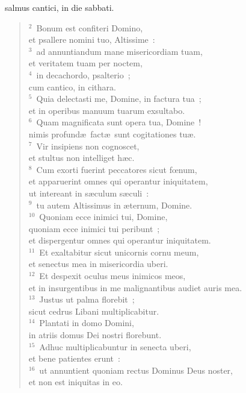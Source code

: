 \bchapter
{}salmus cantici, in die sabbati.
\begin{flushleft}\begin{verse}\vspace{6pt}${}^{2}$~Bonum est confiteri Domino,\\ et psallere nomini tuo, Altissime~:\\
${}^{3}$~ad annuntiandum mane misericordiam tuam,\\ et veritatem tuam per noctem,\\
${}^{4}$~in decachordo, psalterio~;\\ cum cantico, in cithara.\\
${}^{5}$~Quia delectasti me, Domine, in factura tua~;\\ et in operibus manuum tuarum exsultabo.\\
${}^{6}$~Quam magnificata sunt opera tua, Domine~!\\ nimis profund\ae\ fact\ae\ sunt cogitationes tu\ae .\\
${}^{7}$~Vir insipiens non cognoscet,\\ et stultus non intelliget h\ae c.\\
${}^{8}$~Cum exorti fuerint peccatores sicut fœnum,\\ et apparuerint omnes qui operantur iniquitatem,\\ ut intereant in s\ae culum s\ae culi~:\\
${}^{9}$~tu autem Altissimus in \ae ternum, Domine.\\
${}^{10}$~Quoniam ecce inimici tui, Domine,\\ quoniam ecce inimici tui peribunt~;\\ et dispergentur omnes qui operantur iniquitatem.\\
${}^{11}$~Et exaltabitur sicut unicornis cornu meum,\\ et senectus mea in misericordia uberi.\\
${}^{12}$~Et despexit oculus meus inimicos meos,\\ et in insurgentibus in me malignantibus audiet auris mea.\\
${}^{13}$~Justus ut palma florebit~;\\ sicut cedrus Libani multiplicabitur.\\
${}^{14}$~Plantati in domo Domini,\\ in atriis domus Dei nostri florebunt.\\
${}^{15}$~Adhuc multiplicabuntur in senecta uberi,\\ et bene patientes erunt~:\\
${}^{16}$~ut annuntient quoniam rectus Dominus Deus noster,\\ et non est iniquitas in eo.\end{verse}\end{flushleft}




